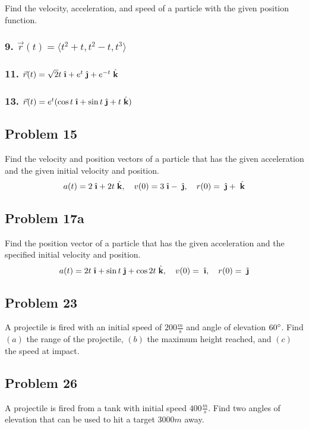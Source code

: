 \documentclass{article}
\newcommand{\ihat}{\;\hat{\textbf{\i}}}
\newcommand{\jhat}{\;\hat{\textbf{\j}}}
\newcommand{\khat}{\;\hat{\textbf{k}}}
\newcommand{\rvec}{\vec{r}(t)}
\begin{document}
Find the velocity, acceleration, and speed of a particle with the given position function.

\subsubsection*{9. $\rvec = \langle t^2+ t, t^2 - t, t^3 \rangle $}
\subsubsection*{11. $\rvec = \sqrt 2 t\ihat + e^t\jhat + e^{-t} \khat$}
\subsubsection*{13. $\rvec = e^t(\cos t\ihat + \sin t\jhat + t\khat)$}
\subsection*{Problem 15}

Find the velocity and position vectors of a particle that has the given acceleration and the given initial velocity and position.
\[
    a(t) = 2\ihat + 2t\khat, \quad v(0) = 3\ihat - \jhat, \quad r(0) = \jhat + \khat
\]

\subsection*{Problem 17a}

Find the position vector of a particle that has the given acceleration and the specified initial velocity and position.
\[
    a(t) = 2t\ihat + \sin t\jhat + \cos 2t\khat, \quad v(0) = \ihat, \quad r(0) = \jhat
\]

\subsection*{Problem 23}

A projectile is fired with an initial speed of $200\frac m s$ and angle of elevation $60 \degree$. Find $(a)$ the range of the projectile, $(b)$ the maximum height reached, and $(c)$ the speed at impact.

\subsection*{Problem 26}

A projectile is fired from a tank with initial speed $400 \frac m s$. Find two angles of elevation that can be used to hit a target $3000m$ away.
\end{document}
